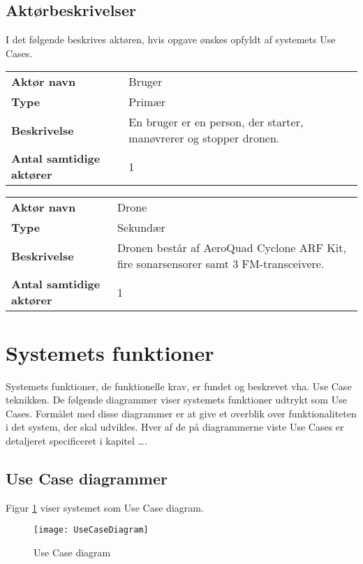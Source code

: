 \documentclass[Main]{subfiles}
\begin{document}
\subsection{Aktørbeskrivelser}
I det følgende beskrives aktøren, hvis opgave ønskes opfyldt af systemets Use Cases. 

\begin{longtable}{p{}|p{}}
\hline
\textbf{Aktør navn}  				& Bruger \\
\textbf{Type} 						& Primær \\
\textbf{Beskrivelse} 				& En bruger er en person, der starter, manøvrerer og stopper dronen. \\
\textbf{Antal samtidige aktører} 	& 1 \\
\hline
\end{longtable}

\begin{longtable}{p{}|p{}}
\hline
\textbf{Aktør navn}  				& Drone \\
\textbf{Type} 						& Sekundær \\
\textbf{Beskrivelse} 				& Dronen består af AeroQuad Cyclone ARF Kit, fire sonarsensorer samt 3 FM-transceivere. \\
\textbf{Antal samtidige aktører} 	& 1 \\
\hline
\end{longtable}


\section{Systemets funktioner}
Systemets funktioner, de funktionelle krav, er fundet og beskrevet vha. Use Case teknikken. 
De følgende diagrammer viser systemets funktioner udtrykt som Use Cases. 
Formålet med disse diagrammer er at give et overblik over funktionaliteten i det system, der skal udvikles. 
Hver af de på diagrammerne viste Use Cases er detaljeret specificeret i kapitel \dots {}.



\subsection{Use Case diagrammer}
Figur \ref{Fig:UC-Diagram} viser systemet som Use Case diagram.

\begin{figure}[hbtp]
\centering
\texttt{[image: UseCaseDiagram]}
\caption{Use Case diagram}
\label{Fig:UC-Diagram}
\end{figure}
\end{document}
